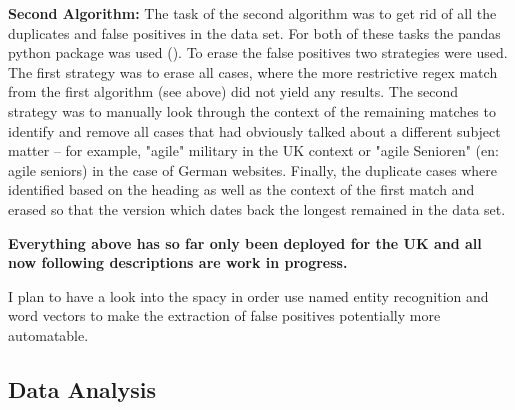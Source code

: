\textbf{Second Algorithm:} The task of the second algorithm was to get rid of all the duplicates and false positives in the data set. For both of these tasks the pandas python package was used (\cite{McKinney2010}). To erase the false positives two strategies were used. The first strategy was to erase all cases, where the more restrictive regex match from the first algorithm (see above) did not yield any results. The second strategy was to manually look through the context of the remaining matches to identify and remove all cases that had obviously talked about a different subject matter – for example, "agile" military in the UK context or "agile Senioren" (en: agile seniors) in the case of German websites. Finally, the duplicate cases where identified based on the heading as well as the context of the first match and erased so that the version which dates back the longest remained in the data set.\par 


\vspace{3pt}
\begin{center}
    \textbf{Everything above has so far only been deployed for the UK and all now following descriptions are work in progress.}
\end{center}

I plan to have a look into the spacy in order use named entity recognition and word vectors to make the extraction of false positives potentially more automatable. 


\subsection{Data Analysis}






